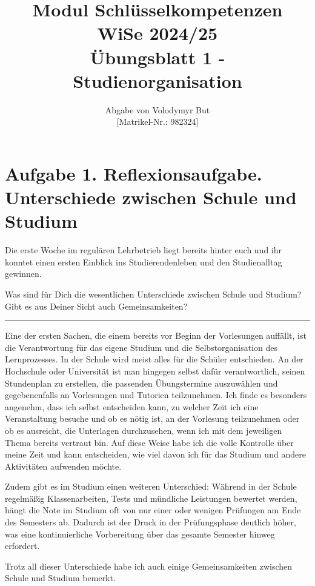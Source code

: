 \documentclass[10pt, oneside]{article}
\title{Modul Schlüsselkompetenzen\\[5pt]\Large WiSe 2024/25\\[10pt]{\"U}bungsblatt 1 - Studienorganisation}
\author{Abgabe von Volodymyr But\\[5pt][Matrikel-Nr.: 982324]}
\date{}
\begin{document}
\sloppy

\maketitle
\vspace{25px}

\section{Aufgabe 1. Reflexionsaufgabe. Unterschiede zwischen Schule und Studium}

Die erste Woche im regulären Lehrbetrieb liegt bereits hinter euch und ihr konntet einen
ersten Einblick ins Studierendenleben und den Studienalltag gewinnen.

Was sind für Dich die wesentlichen Unterschiede zwischen
Schule und Studium? Gibt es aus Deiner Sicht auch Gemeinsamkeiten?

\vspace{10pt}
\hrule
\vspace{5pt}

Eine der ersten Sachen, die einem bereits vor Beginn der
Vorlesungen auffällt, ist die Verantwortung für das eigene Studium und die
Selbstorganisation des Lernprozesses. In der Schule wird meist alles für die
Schüler entschieden. An der Hochschule oder Universität ist man hingegen selbst
dafür verantwortlich, seinen Stundenplan zu erstellen, die passenden
Übungstermine auszuwählen und gegebenenfalls an Vorlesungen und Tutorien
teilzunehmen. Ich finde es besonders angenehm, dass ich selbst entscheiden
kann, zu welcher Zeit ich eine Veranstaltung besuche und ob es nötig ist, an
der Vorlesung teilzunehmen oder ob es ausreicht, die Unterlagen durchzusehen,
wenn ich mit dem jeweiligen Thema bereits vertraut bin. Auf diese Weise habe
ich die volle Kontrolle über meine Zeit und kann entscheiden, wie viel davon
ich für das Studium und andere Aktivitäten aufwenden möchte.

Zudem gibt es im Studium einen weiteren Unterschied: Während in der Schule
regelmäßig Klassenarbeiten, Tests und mündliche Leistungen bewertet werden,
hängt die Note im Studium oft von nur einer oder wenigen Prüfungen am Ende des
Semesters ab. Dadurch ist der Druck in der Prüfungsphase deutlich höher, was
eine kontinuierliche Vorbereitung über das gesamte Semester hinweg erfordert.

Trotz all dieser Unterschiede habe ich auch einige Gemeinsamkeiten zwischen
Schule und Studium bemerkt.
\end{document}
